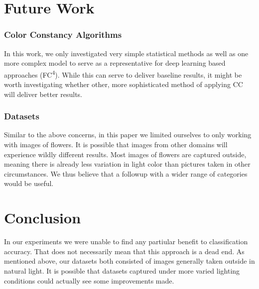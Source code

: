\section{Future Work}

\subsubsection{Color Constancy Algorithms}

In this work, we only investigated very simple statistical methods as well as one more complex model to serve as a representative
for deep learning based approaches (FC\textsuperscript{4}). While this can serve to deliver baseline results, it might be worth investigating
whether other, more sophisticated method of applying \gls{CC} will deliver better results.

\subsubsection{Datasets}

Similar to the above concerns, in this paper we limited ourselves to only working with images of flowers. It is possible that images from
other domains will experience wildly different results. Most images of flowers are captured outside, meaning there is already less variation in
light color than pictures taken in other circumstances. We thus believe that a followup with a wider range of categories would be useful.


\section{Conclusion}

In our experiments we were unable to find any partiular benefit to classification accuracy. That does not necessarily mean that this approach is a dead
end. As mentioned above, our datasets both consisted of images generally taken outside in natural light. It is possible that datasets captured under
more varied lighting conditions could actually see some improvements made.